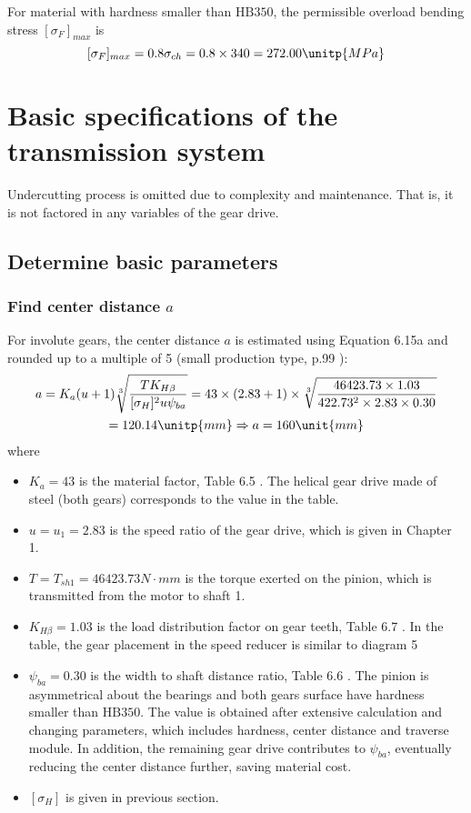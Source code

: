 For material with hardness smaller than $ \text{HB}350 $, the permissible overload bending stress $ [\sigma_F]_{max} $ is
\[ [\sigma_F]_{max} = 0.8\sigma_{ch} = 0.8\times 340 = 272.00\unitp{MPa} \]

\section{Basic specifications of the transmission system}
Undercutting process is omitted due to complexity and maintenance. That is, it is not factored in any variables of the gear drive.
\subsection{Determine basic parameters}
\subsubsection{Find center distance $ a $}
For involute gears, the center distance $ a $ is estimated using Equation 6.15a \cite{tk1} and rounded up to a multiple of 5 (small production type, p.99 \cite{tk1}):
\begin{multline*}
a= K_a(u+1)\sqrt[3]{\dfrac{TK_{H\beta}}{[\sigma_H]^2u\psi_{ba}}}	=  43\times(2.83+1)\times\sqrt[3]{\dfrac{46423.73\times 1.03}{422.73^2\times 2.83\times 0.30}}\\
= 120.14 \unitp{mm} \Rightarrow a= 160 \unit{mm}
\end{multline*}
where
\begin{itemize}
	\item $ K_a=43 $ is the material factor, Table 6.5 \cite{tk1}. The helical gear drive made of steel (both gears) corresponds to the value in the table.
	\item $ u =u_1 = 2.83$ is the speed ratio of the gear drive, which is given in Chapter 1.
	\item $ T=T_{sh1}= 46423.73\unit{N\cdot mm}$ is the torque exerted on the pinion, which is transmitted from the motor to shaft 1.
	\item $ K_{H\beta} = 1.03 $ is the load distribution factor on gear teeth, Table 6.7 \cite{tk1}. In the table, the gear placement in the speed reducer is similar to diagram 5
	\item $ \psi_{ba} = 0.30 $ is the width to shaft distance ratio, Table 6.6 \cite{tk1}. The pinion is asymmetrical about the bearings and both gears surface have hardness smaller than $ \text{HB}350 $. The value is obtained after extensive calculation and changing parameters, which includes hardness, center distance and traverse module. In addition, the remaining gear drive contributes to $ \psi_{ba} $, eventually reducing the center distance further, saving material cost.
	\item $ [\sigma_H] $ is given in previous section.
\end{itemize}

